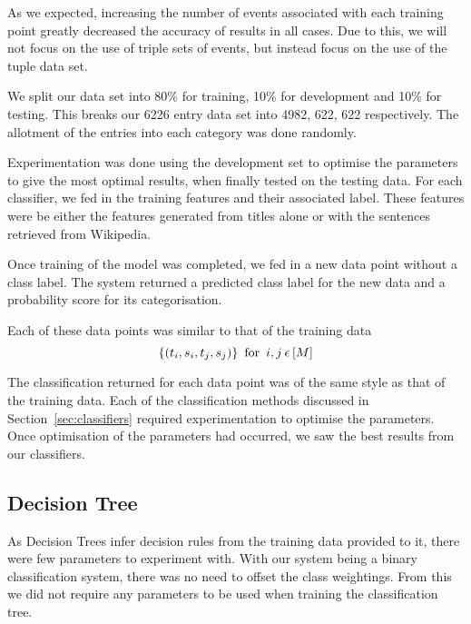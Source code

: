 \documentclass[bsc,frontabs,twoside,singlespacing,parskip,deptreport]{infthesis}     %
\begin{document}
As we expected, increasing the number of events associated with each training point greatly decreased the accuracy of results in all cases.
Due to this, we will not focus on the use of triple sets of events, but instead focus on the use of the tuple data set.

We split our data set into 80\% for training, 10\% for development and 10\% for testing.
This breaks our 6226 entry data set into 4982, 622, 622 respectively.
The allotment of the entries into each category was done randomly.

Experimentation was done using the development set to optimise the parameters to give the most optimal results,
when finally tested on the testing data.
For each classifier, we fed in the training features and their associated label. These features were
be either the features generated from titles alone or with the sentences retrieved from Wikipedia.

Once training of the model was completed, we fed in a new data point without a class label.
The system returned a predicted class label for the new data and a probability score for its categorisation.

Each of these data points was similar to that of the training data
 \begin{equation}
   \{(t_{i},s_{i},t_{j},s_{j})\} \hspace{0.5em} \text{for} \hspace{0.5em} i,j \hspace{0.2em}\epsilon \hspace{0.2em}[M]\nonumber
 \end{equation}

 The classification returned for each data point was of the same style as that of the training data.
 Each of the classification methods discussed in Section~\ref{sec:classifiers} required experimentation to optimise the
 parameters. Once optimisation of the parameters had occurred, we saw the best results from our classifiers.

 \subsection{Decision Tree}
 As Decision Trees infer decision rules from the training data provided to it, there were few parameters to
 experiment with. With our system being a binary classification system, there was no need to offset the class weightings.
 From this we did not require any parameters to be used when training the classification tree.
 
\end{document}
